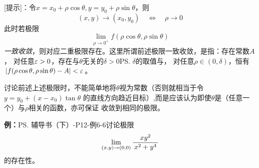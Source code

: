 [提示]：令$x=x_0+\rho\cos\theta,y=y_0+\rho\sin\theta$，则
$$(x,y)\to(x_0,y_0)\quad\Leftrightarrow\quad\rho\to0$$
此时若极限
$$\lim\limits_{\rho\to{0^+}}f(\rho\cos\theta,\rho\sin\theta)$$
{\it 一致收敛}，则对应二重极限存在。这里所谓前述极限一致收敛，是指：存在常数$A$，
对任意$\varepsilon>0$，存在与$\theta$无关的$\delta>0$\ps{$\delta$的取值与}，
对任意$\rho\in(0,\delta)$，恒有$|f(\rho\cos\theta,\rho\sin\theta)-A|<\varepsilon$。

讨论前述上述极限时，不能简单地将$\theta$视为常数（否则就相当于令$y=y_0+(x-x_0)\tan\theta$
的直线方向趋近目标）,而是应该认为即使$\theta$是（任意一个）与$\rho$相关的函数，亦可保证
收敛到相同的极限。

{\bf 例：}\ps{辅导书（下）-P12-例6-6}讨论极限
$$\lim\limits_{(x,y)\to(0,0)}\displaystyle\frac{\,{xy^2}\,}{\,{x^2+y^4}\,}$$
的存在性。

\begin{center}
	\quad

\end{center}
